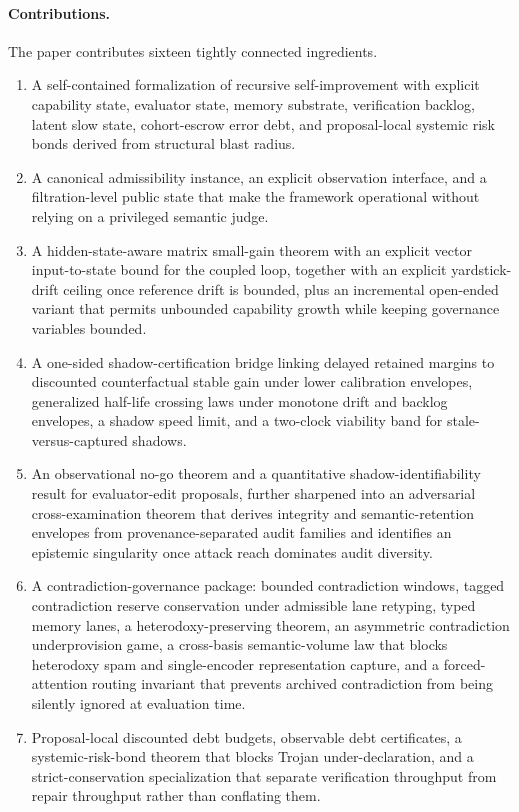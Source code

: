 \documentclass[11pt]{article}
\theoremstyle{definition}
\newcommand{\1}{\mathbf{1}}
\begin{document}
\paragraph{Contributions.} The paper contributes sixteen tightly connected ingredients.
\begin{enumerate}[leftmargin=1.8em]
  \item A self-contained formalization of recursive self-improvement with explicit capability state, evaluator state, memory substrate, verification backlog, latent slow state, cohort-escrow error debt, and proposal-local systemic risk bonds derived from structural blast radius.
  \item A canonical admissibility instance, an explicit observation interface, and a filtration-level public state that make the framework operational without relying on a privileged semantic judge.
  \item A hidden-state-aware matrix small-gain theorem with an explicit vector input-to-state bound for the coupled loop, together with an explicit yardstick-drift ceiling once reference drift is bounded, plus an incremental open-ended variant that permits unbounded capability growth while keeping governance variables bounded.
  \item A one-sided shadow-certification bridge linking delayed retained margins to discounted counterfactual stable gain under lower calibration envelopes, generalized half-life crossing laws under monotone drift and backlog envelopes, a shadow speed limit, and a two-clock viability band for stale-versus-captured shadows.
  \item An observational no-go theorem and a quantitative shadow-identifiability result for evaluator-edit proposals, further sharpened into an adversarial cross-examination theorem that derives integrity and semantic-retention envelopes from provenance-separated audit families and identifies an epistemic singularity once attack reach dominates audit diversity.
  \item A contradiction-governance package: bounded contradiction windows, tagged contradiction reserve conservation under admissible lane retyping, typed memory lanes, a heterodoxy-preserving theorem, an asymmetric contradiction underprovision game, a cross-basis semantic-volume law that blocks heterodoxy spam and single-encoder representation capture, and a forced-attention routing invariant that prevents archived contradiction from being silently ignored at evaluation time.
  \item Proposal-local discounted debt budgets, observable debt certificates, a systemic-risk-bond theorem that blocks Trojan under-declaration, and a strict-conservation specialization that separate verification throughput from repair throughput rather than conflating them.

\end{enumerate}
\end{document}
